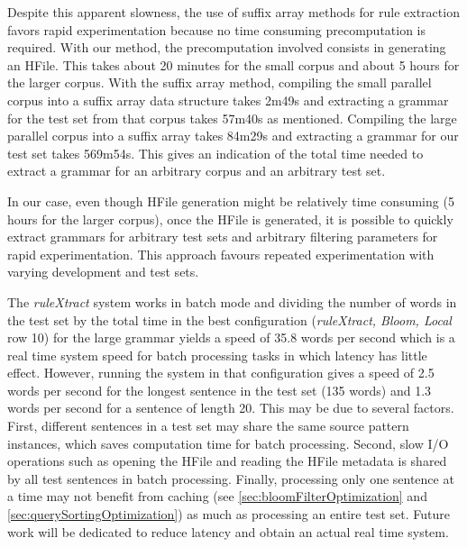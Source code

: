 Despite this apparent slowness, the use of suffix array methods for rule extraction
favors rapid experimentation because no time consuming precomputation is required.
With our method, the precomputation involved consists in generating an HFile.
This takes about 20 minutes for the small corpus and about 5 hours for the larger
corpus. With the suffix array method,
compiling the small parallel corpus into a suffix array
data structure takes 2m49s and extracting a grammar for the test set from
that corpus takes 57m40s as mentioned. Compiling the large parallel corpus
into a suffix array takes 84m29s and extracting a grammar for our test set
takes 569m54s. This gives an indication of the total
time needed to extract a grammar for an arbitrary corpus and an arbitrary test
set.


In our case, even though HFile generation might be relatively
time consuming (5 hours for the larger corpus), once
the HFile is generated, it is possible to quickly extract grammars
for arbitrary test sets and arbitrary filtering parameters for rapid
experimentation. This approach favours repeated experimentation
with varying development and test sets.

The \emph{ruleXtract} system works in batch mode and dividing the number of
words in the test set by the total time in the best configuration
(\emph{ruleXtract, Bloom, Local} row 10) for the large grammar yields
a speed of 35.8
words per second which is a real time system speed for batch processing tasks in
which latency has little effect. However, running the system in that
configuration gives a speed of 2.5 words per second for the longest sentence in
the test set (135 words) and 1.3 words per second for a sentence of length 20.
This may be due to several factors.
First, different sentences in a test set may share the same source pattern
instances, which saves computation time for batch processing. Second,
slow I/O operations such as opening the HFile and reading the HFile metadata is shared
by all test sentences in batch processing. Finally, processing only one
sentence at a time may not benefit from caching
(see \autoref{sec:bloomFilterOptimization} and \autoref{sec:querySortingOptimization})
as much as processing an entire test set.
Future work will be dedicated to reduce latency and obtain an actual real time
system.

